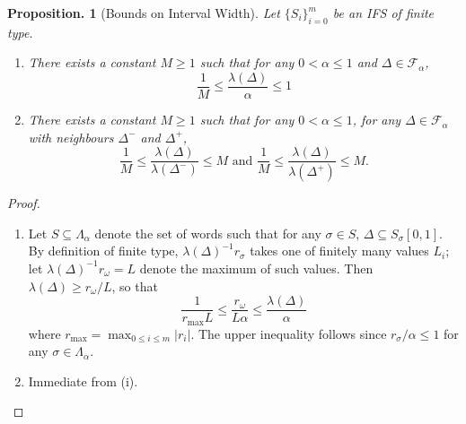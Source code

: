 \documentclass[11pt, a4paper]{memoir}
\theoremstyle{change}
\newtheorem{proposition}[theorem]{Proposition.}
\theoremstyle{plain}
\theoremstyle{nonumberplain}
\newtheorem{proof}{Proof}
\numberwithin{equation}{section}
\begin{document}
\begin{proposition}[Bounds on Interval Width]
    Let $\{S_i\}_{i=0}^m$ be an IFS of finite type.
    \begin{enumerate}[nl,r]
        \item There exists a constant $M\geq 1$ such that for any $0<\alpha\leq 1$ and $\Delta\in\mathcal{F}_\alpha$, \begin{equation*} \frac{1}{M}\leq \frac{\lambda(\Delta)}{\alpha}\leq 1 \end{equation*}
        \item There exists a constant $M\geq 1$ such that for any $0<\alpha\leq 1$, for any $\Delta\in\mathcal{F}_\alpha$ with neighbours $\Delta^-$ and $\Delta^+$,
            \begin{equation*}
                \frac{1}{M}\leq \frac{\lambda(\Delta)}{\lambda(\Delta^-)}\leq M\text{ and } \frac{1}{M}\leq \frac{\lambda(\Delta)}{\lambda(\Delta^+)}\leq M.
            \end{equation*}
    \end{enumerate}
\end{proposition}
\begin{proof}
    \begin{enumerate}[nl,r]
        \item Let $S\subseteq\Lambda_\alpha$ denote the set of words such that for any $\sigma\in S$, $\Delta\subseteq S_\sigma[0,1]$.
            By definition of finite type, $\lambda(\Delta)^{-1}r_\sigma$ takes one of finitely many values $L_i$; let $\lambda(\Delta)^{-1}r_\omega=L$ denote the maximum of such values.
            Then $\lambda(\Delta)\geq r_\omega/L$, so that
            \begin{equation*}
                \frac{1}{r_{\max}L}\leq \frac{r_\omega}{L\alpha}\leq \frac{\lambda(\Delta)}{\alpha}
            \end{equation*}
            where $r_{\max}=\max_{0\leq i\leq m}|r_i|$.
            The upper inequality follows since $r_\sigma/\alpha\leq 1$ for any $\sigma\in\Lambda_\alpha$.
        \item Immediate from (i).
    \end{enumerate}
\end{proof}
\end{document}
